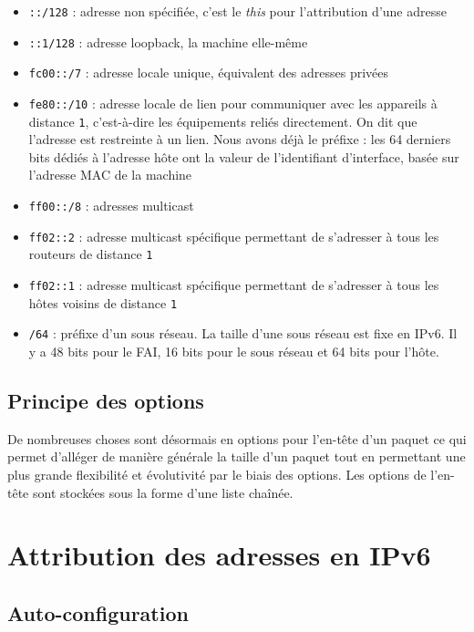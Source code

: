 \begin{itemize}
  \item	\texttt{::/128} : adresse non spécifiée, c’est le \emph{this} pour l’attribution d’une adresse
  \item	\texttt{::1/128} : adresse loopback, la machine elle-même
  \item	\texttt{fc00::/7} : adresse locale unique, équivalent des adresses privées
  \item \texttt{fe80::/10} : adresse locale de lien pour communiquer avec les appareils à distance \texttt{1}, c’est-à-dire les équipements reliés directement. On dit que l’adresse est restreinte à un lien. Nous avons déjà le préfixe : les 64 derniers bits dédiés à l’adresse hôte ont la valeur de l’identifiant d’interface, basée sur l’adresse MAC de la machine
  \item \texttt{ff00::/8} : adresses multicast
  \item \texttt{ff02::2} : adresse multicast spécifique permettant de s’adresser à tous les routeurs de distance \texttt{1}
  \item \texttt{ff02::1} : adresse multicast spécifique permettant de s’adresser à tous les hôtes voisins de distance \texttt{1}
  \item \texttt{/64} : préfixe d’un sous réseau. La taille d’une sous réseau est fixe en IPv6. Il y a 48 bits pour le FAI, 16 bits pour le sous réseau et 64 bits pour l’hôte.
\end{itemize}

\subsection{Principe des options}

De nombreuses choses sont désormais en options pour l’en-tête d’un paquet ce qui permet d’alléger de manière générale la taille d’un paquet tout en permettant une plus grande flexibilité et évolutivité par le biais des options.
Les options de l’en-tête sont stockées sous la forme d’une liste chaînée.

\newpage
\section{Attribution des adresses en IPv6}

\subsection{Auto-configuration}

